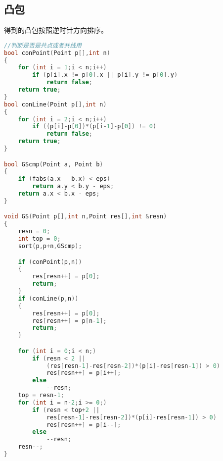 \subsection{凸包}
	得到的凸包按照逆时针方向排序。
	\begin{lstlisting}[language=c++]
//判断是否是共点或者共线用
bool conPoint(Point p[],int n)
{
	for (int i = 1;i < n;i++)
		if (p[i].x != p[0].x || p[i].y != p[0].y)
			return false;
	return true;
}
bool conLine(Point p[],int n)
{
	for (int i = 2;i < n;i++)
		if ((p[i]-p[0])*(p[i-1]-p[0]) != 0)
			return false;
	return true;
}

bool GScmp(Point a, Point b)
{
	if (fabs(a.x - b.x) < eps)
		return a.y < b.y - eps;
	return a.x < b.x - eps;
}

void GS(Point p[],int n,Point res[],int &resn)
{
	resn = 0;
	int top = 0;
	sort(p,p+n,GScmp);

	if (conPoint(p,n))
	{
		res[resn++] = p[0];
		return;
	}
	if (conLine(p,n))
	{
		res[resn++] = p[0];
		res[resn++] = p[n-1];
		return;
	}

	for (int i = 0;i < n;)
		if (resn < 2 || 
			(res[resn-1]-res[resn-2])*(p[i]-res[resn-1]) > 0)
			res[resn++] = p[i++];
		else
			--resn;
	top = resn-1;
	for (int i = n-2;i >= 0;)
		if (resn < top+2 || 
			res[resn-1]-res[resn-2])*(p[i]-res[resn-1]) > 0)
			res[resn++] = p[i--];
		else
			--resn;
	resn--;
}
	\end{lstlisting}
	

